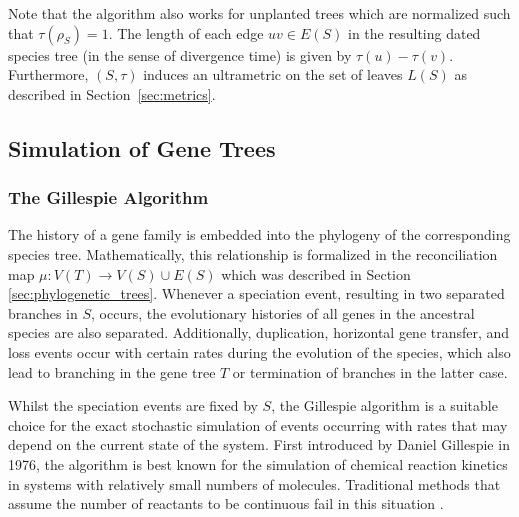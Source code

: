 \documentclass[hidelinks,11pt]{scrreprt}
\begin{document}
Note that the algorithm also works for unplanted trees which are normalized such that $\tau(\rho_S)=1$. The length of each edge $uv \in E(S)$ in the resulting dated species tree (in the sense of divergence time) is given by $\tau(u)-\tau(v)$. Furthermore, $(S, \tau)$ induces an ultrametric on the set of leaves $L(S)$ as described in Section~\ref{sec:metrics}.


\subsection{Simulation of Gene Trees}
\label{sec:gene_tree_sim}

\subsubsection{The Gillespie Algorithm}

The history of a gene family is embedded into the phylogeny of the corresponding species tree. Mathematically, this relationship is formalized in the reconciliation map $\mu:V(T)\to V(S)\cup E(S)$ which was described in Section \ref{sec:phylogenetic_trees}.
Whenever a speciation event, resulting in two separated branches in $S$, occurs, the evolutionary histories of all genes in the ancestral species are also separated. Additionally, duplication, horizontal gene transfer, and loss events occur with certain rates during the evolution of the species, which also lead to branching in the gene tree $T$ or termination of branches in the latter case.

Whilst the speciation events are fixed by $S$, the Gillespie algorithm is a suitable choice for the exact stochastic simulation of events occurring with rates that may depend on the current state of the system. First introduced by Daniel Gillespie in 1976, the algorithm is best known for the simulation of chemical reaction kinetics in systems with relatively small numbers of molecules. Traditional methods that assume the number of reactants to be continuous fail in this situation \citep{gillespie1977}.
\end{document}
